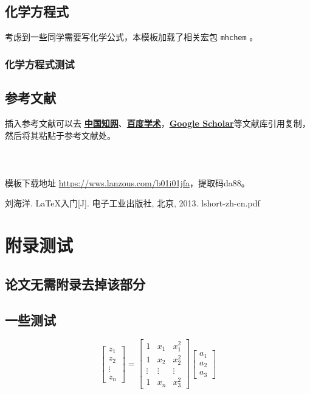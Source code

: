 \documentclass{imutthesis}
\begin{document}
\subsection{化学方程式}
考虑到一些同学需要写化学公式，本模板加载了相关宏包 \verb|mhchem| 。
\subsubsection{化学方程式测试}
\subsection{参考文献}
插入参考文献可以去 \href{https://www.cnki.net/}{\textbf{中国知网}}、\href{https://xueshu.baidu.com/}{\textbf{百度学术}}，\href{https://scholar.google.com/}{\textbf{Google Scholar}}等文献库引用复制，然后将其粘贴于参考文献处。
~\\~\\~\\~\\

{模板下载地址 \url{https://wws.lanzous.com/b01i01jfa}，提取码da88。}


\begin{thebibliography}{1}%
\bibitem{} 刘海洋. \LaTeX 入门[J]. 电子工业出版社, 北京, 2013.
\bibitem{} lshort-zh-cn.pdf
\bibitem{}
\bibitem{}    
\end{thebibliography}


\appendix
\section{附录测试}
\subsection{论文无需附录去掉该部分}

\subsection{一些测试}
\begin{equation} 
\begin{bmatrix}
	z_{1}\\
	z_{2}\\
	\vdots\\
	z_{n}
\end{bmatrix}
=\begin{bmatrix}
	1 & x_{1}  &x_{1}^{2}  \\
	1& x_{2} & x_{2}^{2} \\
	\vdots & \vdots & \vdots\\
	1 & x_{n} & x_{3}^{2}
\end{bmatrix}
\begin{bmatrix}
	a_{1} \\
	a_{2} \\
	a_{3} 
\end{bmatrix}
\end{equation}
\end{document}
